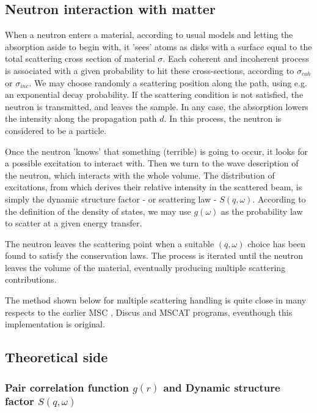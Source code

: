 \subsection{Neutron interaction with matter}

When a neutron enters a material, according to usual models and letting the absorption aside to begin with, it 'sees' atoms as disks with a surface equal to the total scattering cross section of material $\sigma$. Each coherent and incoherent process is associated with a given probability to hit these cross-sections, according to $\sigma_{coh}$ or $\sigma_{inc}$. We may choose randomly a scattering position along the path, using e.g. an exponential decay probability. If the scattering condition is not satisfied, the neutron is transmitted, and leaves the sample. In any case, the absorption lowers the intensity along the propagation path $d$. In this process, the neutron is considered to be a particle.

Once the neutron 'knows' that something (terrible) is going to occur, it looks for a possible excitation to interact with. Then we turn to the wave description of the neutron, which interacts with the whole volume. The distribution of excitations, from which derives their relative intensity in the scattered beam, is simply the dynamic structure factor - or scattering law - $S(q,\omega)$. According to the definition of the density of states, we may use $g(\omega)$ as the probability law to scatter at a given energy transfer.

The neutron leaves the scattering point when a suitable $(q, \omega)$ choice has been found to satisfy the conservation laws. The process is iterated until the neutron leaves the volume of the material, eventually producing multiple scattering contributions.

The method shown below for multiple scattering handling is quite close in many respects to the earlier MSC \cite{msc}, Discus \cite{discus} and MSCAT \cite{mscat} programs, eventhough this implementation is original.

\subsection{Theoretical side}

\subsubsection{Pair correlation function $g(r)$ and Dynamic structure factor $S(q,\omega)$}

